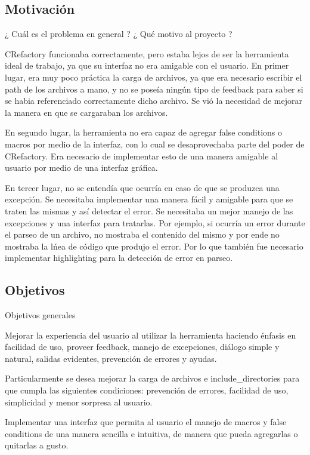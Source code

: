 \documentclass[a4paper,oneside,10pt]{article}
\begin{document}
\subsection{Motivaci\'on}
¿ Cu\'al es el problema en general ? ¿ Qu\'e motivo al proyecto ?

CRefactory funcionaba correctamente, pero estaba lejos de ser la herramienta ideal de trabajo, ya que su interfaz no era amigable con el usuario. En primer lugar, era muy poco pr\'actica la carga de archivos, ya que era necesario escribir el path de los archivos a mano, y no se pose\'ia ning\'un tipo de feedback para saber si se habia referenciado correctamente dicho archivo. Se vi\'o la necesidad de mejorar la manera en que se cargaraban los archivos.

En segundo lugar, la herramienta no era capaz de agregar false conditions o macros por medio de la interfaz, con lo cual se desaprovechaba  parte del poder de CRefactory. Era necesario de implementar esto de una manera amigable al usuario por medio de una interfaz gr\'afica.

En tercer lugar, no se entend\'ia que ocurr\'ia en caso de que se produzca una excepci\'on. Se necesitaba implementar una manera f\'acil y amigable para que se traten las mismas y as\'i detectar el error. Se necesitaba un mejor manejo de las excepciones y una interfaz para tratarlas.
Por ejemplo, si ocurr\'ia un error durante el parseo de un archivo, no mostraba el contenido del mismo y por ende no mostraba la l\'nea de c\'odigo que produjo el error. Por lo que tambi\'en fue necesario implementar highlighting para la detecci\'on de error en parseo.


\subsection{Objetivos}
Objetivos generales

Mejorar la experiencia del usuario al utilizar la herramienta haciendo \'enfasis en facilidad de uso, proveer feedback, manejo de excepciones, di\'alogo simple y natural, salidas evidentes, prevenci\'on de errores y ayudas.

Particularmente se desea mejorar la carga de archivos e include\_directories para que cumpla las siguientes condiciones: prevenci\'on de errores, facilidad de uso, simplicidad y menor sorpresa al usuario.

Implementar una interfaz que permita al usuario el manejo de macros y false conditions de una manera sencilla e intuitiva, de manera que pueda agregarlas o quitarlas a gusto.
\end{document}
